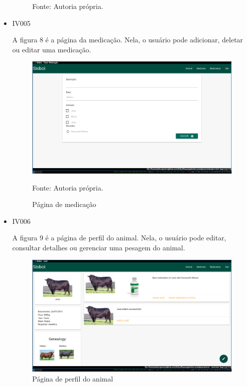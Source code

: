 \begin{itemize}
\begin{figure}[H]
\begin{center}
		Fonte: Autoria própria.
	\end{center}
\end{figure}

\newpage
\item IV005

A figura 8 é a página da medicação. Nela, o usuário pode adicionar, deletar ou editar uma medicação.
\begin{figure}[H]
	\begin{center}
		\caption{Página de medicação}
		\includegraphics[width=13cm]{../img/prototipos/medicacao.png}

		Fonte: Autoria própria.
	\end{center}
\end{figure}

\item IV006

A figura 9 é a página de perfil do animal. Nela, o usuário pode editar, consultar detalhes ou gerenciar uma pesagem do animal.
\begin{figure}[H]
	\begin{center}
		\caption{Página de perfil do animal}
		\includegraphics[width=13cm]{../img/prototipos/perfil.png}


\end{center}
\end{figure}
\end{itemize}
